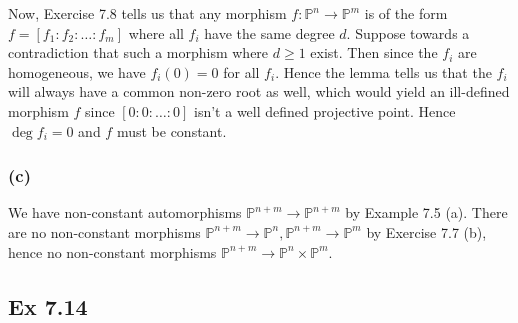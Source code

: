 \documentclass{article}
\theoremstyle{definition}
\renewcommand{\P}{\mathbb{P}}
\newcommand{\PP}[1]{\P^{#1}}
\begin{document}
Now, Exercise 7.8 tells us that any morphism $f : \PP{n} \to \PP{m}$ is of the
form $f = [f_1 : f_2 : \ldots : f_m ]$ where all $f_i$ have the same degree
$d$. Suppose towards a contradiction that such a morphism where $d \geq 1$
exist. Then since the $f_i$ are homogeneous, we have $f_i(0) = 0$ for all
$f_i$. Hence the lemma tells us that the $f_i$ will always have a common
non-zero root as well, which would yield an ill-defined morphism $f$ since $[0
: 0 : \ldots : 0]$ isn't a well defined projective point. Hence $\deg f_i = 0$
and $f$ must be constant. 

\subsubsection*{(c)}

We have non-constant automorphisms $\PP{n + m} \to \PP{n + m}$ by Example 7.5
(a). There are no non-constant morphisms $\PP{n + m} \to \PP{n}, \PP{n + m} \to
\PP{m}$ by Exercise 7.7 (b), hence no non-constant morphisms $\PP{n + m} \to
\PP{n} \times \PP{m}$.

\subsection*{Ex 7.14}
\end{document}
